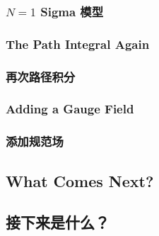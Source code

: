 \documentclass{article}
\begin{document}
\begin{paracol}{2}
\subsubsection*{$N = 1$ Sigma 模型}
\switchcolumn*

\subsubsection{The Path Integral Again}
\switchcolumn
\subsubsection*{再次路径积分}
\switchcolumn*

\subsubsection{Adding a Gauge Field}
\switchcolumn
\subsubsection*{添加规范场}
\switchcolumn*

\subsection{What Comes Next?}
\switchcolumn
\subsection*{接下来是什么？}
\switchcolumn*
\end{paracol}
\end{document}

